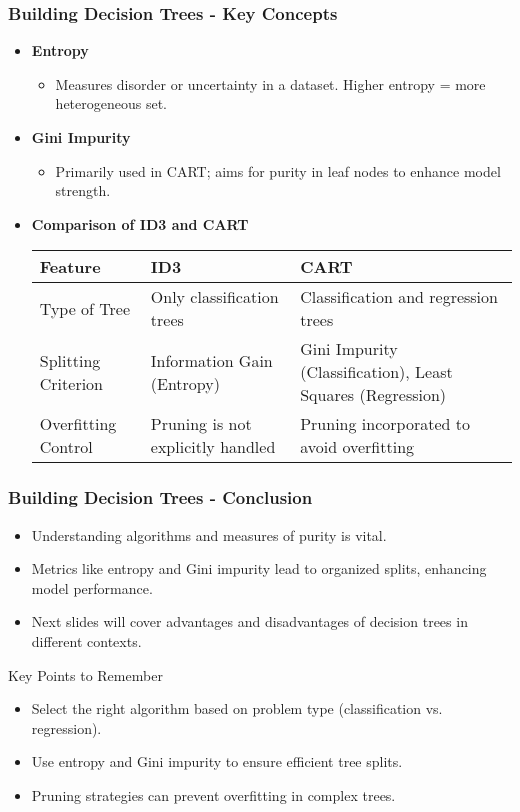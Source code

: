 \documentclass{beamer}
\begin{document}
\begin{frame}[fragile]
    \frametitle{Building Decision Trees - Key Concepts}
    \begin{itemize}
        \item \textbf{Entropy} 
        \begin{itemize}
            \item Measures disorder or uncertainty in a dataset. Higher entropy = more heterogeneous set.
        \end{itemize}
        
        \item \textbf{Gini Impurity}
        \begin{itemize}
            \item Primarily used in CART; aims for purity in leaf nodes to enhance model strength.
        \end{itemize}

        \item \textbf{Comparison of ID3 and CART}
        \begin{tabular}{|l|l|l|}
            \hline
            Feature & ID3 & CART \\
            \hline
            Type of Tree & Only classification trees & Classification and regression trees \\
            \hline
            Splitting Criterion & Information Gain (Entropy) & Gini Impurity (Classification), Least Squares (Regression) \\
            \hline
            Overfitting Control & Pruning is not explicitly handled & Pruning incorporated to avoid overfitting \\
            \hline
        \end{tabular}
    \end{itemize}
\end{frame}

\begin{frame}[fragile]
    \frametitle{Building Decision Trees - Conclusion}
    \begin{itemize}
        \item Understanding algorithms and measures of purity is vital.
        \item Metrics like entropy and Gini impurity lead to organized splits, enhancing model performance.
        \item Next slides will cover advantages and disadvantages of decision trees in different contexts.
    \end{itemize}

    \begin{block}{Key Points to Remember}
        \begin{itemize}
            \item Select the right algorithm based on problem type (classification vs. regression).
            \item Use entropy and Gini impurity to ensure efficient tree splits.
            \item Pruning strategies can prevent overfitting in complex trees.
        \end{itemize}
    \end{block}
\end{frame}
\end{document}
